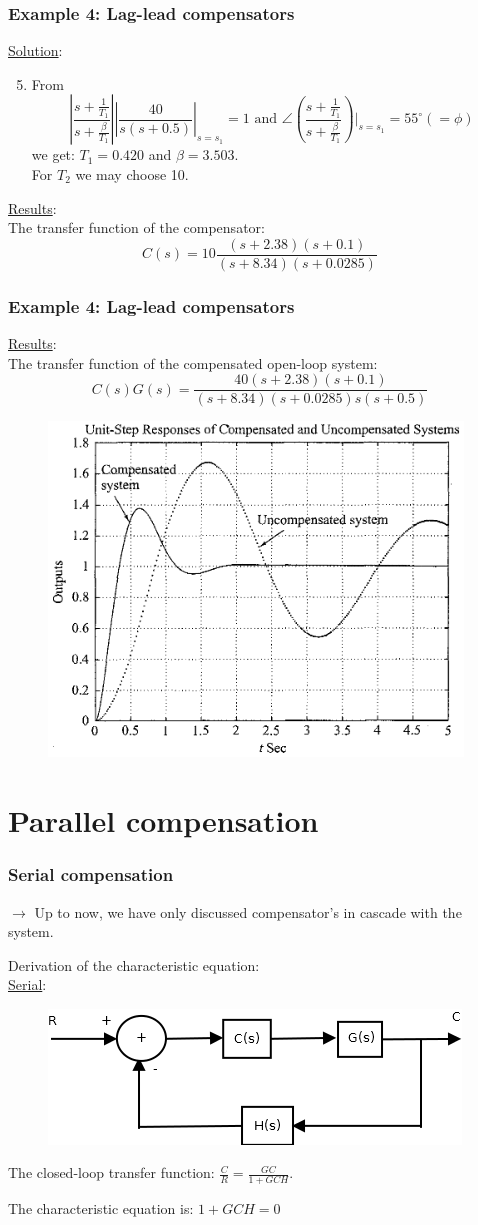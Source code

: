 \begin{frame}
	\frametitle{Example 4: Lag-lead compensators}
	\underline{Solution}:
	\begin{enumerate}
		\setcounter{enumi}{4}
		\item From
		$$|\frac{s+\frac{1}{T_1}}{s+\frac{\beta}{T_1}}||\frac{40}{s(s+0.5)}|_{s=s_1}=1 \text{ and } \angle(\frac{s+\frac{1}{T_1}}{s+\frac{\beta}{T_1}})|_{s=s_1}=55^{\circ}(=\phi)$$
		we get: $T_1=0.420$ and $\beta=3.503$.\\
		For $T_2$ we may choose 10.
	\end{enumerate}
	\underline{Results}:\\
	The transfer function of the compensator:
	$$C(s)=10\frac{(s+2.38)(s+0.1)}{(s+8.34)(s+0.0285)}$$
\end{frame}

\begin{frame}
	\frametitle{Example 4: Lag-lead compensators}
	\underline{Results}:\\
	The transfer function of the compensated open-loop system:
	$$C(s)G(s)=\frac{40(s+2.38)(s+0.1)}{(s+8.34)(s+0.0285)s(s+0.5)}$$
	\begin{figure}
		\centering
		\includegraphics[width=0.48\linewidth]{Ex4_response}
	\end{figure}
\end{frame}

\section{Parallel compensation}

\begin{frame}
	\frametitle{Serial compensation}
	$\rightarrow$ Up to now, we have only discussed compensator's in cascade with the system. \vspace{4mm}
	
	Derivation of the characteristic equation:\\
	\underline{Serial}:
	\begin{figure}
		\centering
		\includegraphics[width=0.7\linewidth]{Serial_compensator}
	\end{figure}
	The closed-loop transfer function: $\frac{C}{R}=\frac{GC}{1+GCH}$.\vspace{3mm}
	
	The characteristic equation is: $1+GCH=0$
\end{frame}

